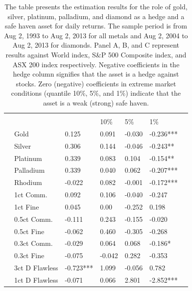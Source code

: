 \documentclass[preprint,authoryear,11pt]{elsarticle}
\begin{document}
\begin{table}[htp!]
	\caption{\newline The table presents the estimation results for the role of gold, silver, platinum, palladium, and diamond as a hedge and a safe haven asset for daily returns. The sample period is from Aug 2, 1993 to Aug 2, 2013 for all metals and Aug 2, 2004 to Aug 2, 2013 for diamonds. Panel A, B, and C represent results against World index, S\&P 500 Composite index, and ASX 200 index respectively. Negative coefficients in the hedge column signifies that the asset is a hedge against stocks. Zero (negative) coefficients in extreme market conditions (quantile 10\%, 5\%, and 1\%) indicate that the asset is a weak (strong) safe haven.}
	\label{tab:eq123_results}
	\renewcommand\arraystretch{0.65}
	\begin{tabularx}{\linewidth}{*{2}{>{\arraybackslash\small}p{.14\linewidth}}
			                     *{4}{>{\arraybackslash\small}p{.14\linewidth}}S[table-format=1.3]}
		\hline
		 \\
		\hline
		      &     &   &  \\
		      &    &        & 10\% & 5\% & 1\% \\
		\hline
		 & Gold  & 0.125 & 0.091 & -0.030 & -0.236*** \\
		                            & Silver & 0.306 & 0.144 & -0.046 & -0.243** \\
		                            & Platinum & 0.339 & 0.083 & 0.104 & -0.154** \\
		                            & Palladium & 0.339 & 0.040 & 0.062 & -0.207*** \\
		                            & Rhodium & -0.022 & 0.082 & -0.001 & -0.172*** \\
		\hline
		 & 1ct Comm. & 0.092 & 0.106 & -0.040 & -0.247 \\
		                          & 1ct Fine & 0.045 & 0.00 & -0.252 & 0.198 \\
		                          & 0.5ct Comm. & -0.111 & 0.243 & -0.155 & -0.020 \\
		                          & 0.5ct Fine & -0.062 & 0.460 & -0.305 & -0.268 \\
		                          & 0.3ct Comm. & -0.029 & 0.064 & 0.068 & -0.186* \\
		                          & 0.3ct Fine & -0.075 & -0.042 & 0.282 & -0.353 \\
		                          & 3ct D Flawless & -0.723*** & 1.099 & -0.056 & 0.782 \\
		                          & 1ct D Flawless & -0.071 & 0.066 & 2.801 & -2.852*** \\
		\hline
	\end{tabularx}
\end{table}
\end{document}
